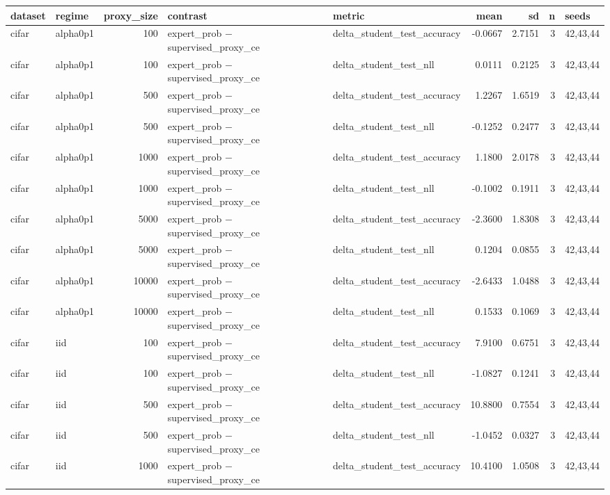 \begin{tabular}{llrllrrrl}
\toprule
dataset & regime & proxy\_size & contrast & metric & mean & sd & n & seeds \\
\midrule
cifar & alpha0p1 & 100 & expert\_prob − supervised\_proxy\_ce & delta\_student\_test\_accuracy & -0.0667 & 2.7151 & 3 & 42,43,44 \\
cifar & alpha0p1 & 100 & expert\_prob − supervised\_proxy\_ce & delta\_student\_test\_nll & 0.0111 & 0.2125 & 3 & 42,43,44 \\
cifar & alpha0p1 & 500 & expert\_prob − supervised\_proxy\_ce & delta\_student\_test\_accuracy & 1.2267 & 1.6519 & 3 & 42,43,44 \\
cifar & alpha0p1 & 500 & expert\_prob − supervised\_proxy\_ce & delta\_student\_test\_nll & -0.1252 & 0.2477 & 3 & 42,43,44 \\
cifar & alpha0p1 & 1000 & expert\_prob − supervised\_proxy\_ce & delta\_student\_test\_accuracy & 1.1800 & 2.0178 & 3 & 42,43,44 \\
cifar & alpha0p1 & 1000 & expert\_prob − supervised\_proxy\_ce & delta\_student\_test\_nll & -0.1002 & 0.1911 & 3 & 42,43,44 \\
cifar & alpha0p1 & 5000 & expert\_prob − supervised\_proxy\_ce & delta\_student\_test\_accuracy & -2.3600 & 1.8308 & 3 & 42,43,44 \\
cifar & alpha0p1 & 5000 & expert\_prob − supervised\_proxy\_ce & delta\_student\_test\_nll & 0.1204 & 0.0855 & 3 & 42,43,44 \\
cifar & alpha0p1 & 10000 & expert\_prob − supervised\_proxy\_ce & delta\_student\_test\_accuracy & -2.6433 & 1.0488 & 3 & 42,43,44 \\
cifar & alpha0p1 & 10000 & expert\_prob − supervised\_proxy\_ce & delta\_student\_test\_nll & 0.1533 & 0.1069 & 3 & 42,43,44 \\
cifar & iid & 100 & expert\_prob − supervised\_proxy\_ce & delta\_student\_test\_accuracy & 7.9100 & 0.6751 & 3 & 42,43,44 \\
cifar & iid & 100 & expert\_prob − supervised\_proxy\_ce & delta\_student\_test\_nll & -1.0827 & 0.1241 & 3 & 42,43,44 \\
cifar & iid & 500 & expert\_prob − supervised\_proxy\_ce & delta\_student\_test\_accuracy & 10.8800 & 0.7554 & 3 & 42,43,44 \\
cifar & iid & 500 & expert\_prob − supervised\_proxy\_ce & delta\_student\_test\_nll & -1.0452 & 0.0327 & 3 & 42,43,44 \\
cifar & iid & 1000 & expert\_prob − supervised\_proxy\_ce & delta\_student\_test\_accuracy & 10.4100 & 1.0508 & 3 & 42,43,44 \\

\end{tabular}
